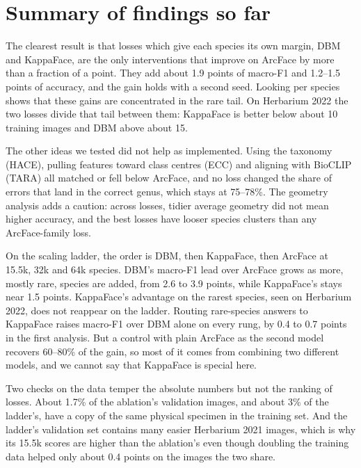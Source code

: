 \documentclass[11pt]{article}
\begin{document}
\section{Summary of findings so far}
\label{sec:summary}

The clearest result is that losses which give each species its own margin, DBM and
KappaFace, are the only interventions that improve on ArcFace by more than a fraction of
a point. They add about 1.9 points of macro-F1 and 1.2--1.5 points of accuracy, and the
gain holds with a second seed. Looking per species shows that these gains are
concentrated in the rare tail. On Herbarium 2022 the two losses divide that tail between
them: KappaFace is better below about 10 training images and DBM above about 15.

The other ideas we tested did not help as implemented. Using the taxonomy (HACE),
pulling features toward class centres (ECC) and aligning with BioCLIP (TARA) all
matched or fell below ArcFace, and no loss changed the share of errors that land in the
correct genus, which stays at 75--78\%. The geometry analysis adds a caution: across
losses, tidier average geometry did not mean higher accuracy, and the best losses have
looser species clusters than any ArcFace-family loss.

On the scaling ladder, the order is DBM, then KappaFace, then ArcFace at 15.5k, 32k and
64k species. DBM's macro-F1 lead over ArcFace grows as more, mostly rare, species are
added, from 2.6 to 3.9 points, while KappaFace's stays near 1.5 points. KappaFace's
advantage on the rarest species, seen on Herbarium 2022, does not reappear on the ladder.
Routing rare-species answers to KappaFace raises macro-F1 over DBM alone on every rung,
by 0.4 to 0.7 points in the first analysis. But a control with plain ArcFace as the second
model recovers 60--80\% of the gain, so most of it comes from combining two different
models, and we cannot say that KappaFace is special here.

Two checks on the data temper the absolute numbers but not the ranking of losses. About
1.7\% of the ablation's validation images, and about 3\% of the ladder's, have a copy of
the same physical specimen in the training set. And the ladder's validation set contains
many easier Herbarium 2021 images, which is why its 15.5k scores are higher than the
ablation's even though doubling the training data helped only about 0.4 points on the
images the two share.
\end{document}
